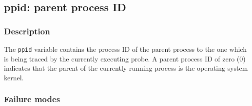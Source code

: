 \clearpage
{}
{}
\label{vars:ppid}
\subsection*{ppid: parent process ID}

\subsubsection*{Description}

The \verb|ppid| variable contains the process ID of the parent process
to the one which is being traced by the currently executing probe.  A
parent process ID of zero (0) indicates that the parent of the
currently running process is the operating system kernel.

\subsubsection*{Failure modes}

